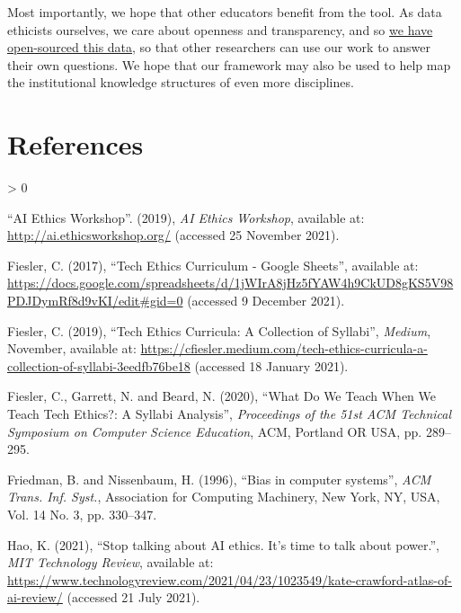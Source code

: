 \documentclass[
]{article}
\newlength{\cslhangindent}
\newenvironment{CSLReferences}[2] %
 {%
  \setlength{\parindent}{0pt}
  \ifodd #1 \everypar{\setlength{\hangindent}{\cslhangindent}}\ignorespaces\fi
  \ifnum #2 > 0
  \setlength{\parskip}{#2\baselineskip}
  \fi
 }%
 {}
\begin{document}
Most importantly, we hope that other educators benefit from the tool. As
data ethicists ourselves, we care about openness and transparency, and
so
\href{https://github.com/JonathanReeve/data-ethics-literature-review}{we
have open-sourced this data}, so that other researchers can use our work
to answer their own questions. We hope that our framework may also be
used to help map the institutional knowledge structures of even more
disciplines.

\hypertarget{references}{%
\section{References}\label{references}}

\hypertarget{refs}{}
\begin{CSLReferences}{1}{0}
\leavevmode\hypertarget{ref-ai_ethics}{}%
{``{AI} {Ethics} {Workshop}''}. (2019), \emph{AI Ethics Workshop},
available at: \url{http://ai.ethicsworkshop.org/} (accessed 25 November
2021).

\leavevmode\hypertarget{ref-fieslerTechEthicsCurriculum2017}{}%
Fiesler, C. (2017), {``Tech {Ethics} {Curriculum} - {Google}
{Sheets}''}, available at:
\url{https://docs.google.com/spreadsheets/d/1jWIrA8jHz5fYAW4h9CkUD8gKS5V98PDJDymRf8d9vKI/edit\#gid=0}
(accessed 9 December 2021).

\leavevmode\hypertarget{ref-fieslerTechEthicsCurricula2019}{}%
Fiesler, C. (2019), {``Tech {Ethics} {Curricula}: {A} {Collection} of
{Syllabi}''}, \emph{Medium}, November, available at:
\url{https://cfiesler.medium.com/tech-ethics-curricula-a-collection-of-syllabi-3eedfb76be18}
(accessed 18 January 2021).

\leavevmode\hypertarget{ref-fieslerWhatWeTeach2020}{}%
Fiesler, C., Garrett, N. and Beard, N. (2020), {``What {Do} {We} {Teach}
{When} {We} {Teach} {Tech} {Ethics}?: {A} {Syllabi} {Analysis}''},
\emph{Proceedings of the 51st {ACM} {Technical} {Symposium} on
{Computer} {Science} {Education}}, ACM, Portland OR USA, pp. 289--295.

\leavevmode\hypertarget{ref-nissenbaum1996}{}%
Friedman, B. and Nissenbaum, H. (1996), {``Bias in computer systems''},
\emph{ACM Trans. Inf. Syst.}, Association for Computing Machinery, New
York, NY, USA, Vol. 14 No. 3, pp. 330--347.

\leavevmode\hypertarget{ref-haoStopTalkingAI2021}{}%
Hao, K. (2021), {``Stop talking about {AI} ethics. {It}'s time to talk
about power.''}, \emph{MIT Technology Review}, available at:
\url{https://www.technologyreview.com/2021/04/23/1023549/kate-crawford-atlas-of-ai-review/}
(accessed 21 July 2021).


\end{CSLReferences}
\end{document}
